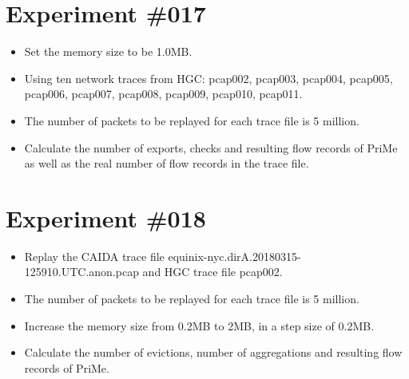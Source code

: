 \documentclass[10pt, conference, letterpaper]{IEEEtran}
\begin{document}
\section*{Experiment \#017}
\begin{itemize}
	\item Set the memory size to be 1.0MB.
	\item Using ten network traces from HGC: pcap002, pcap003, pcap004, pcap005, pcap006, pcap007, pcap008, pcap009, pcap010, pcap011.
	\item The number of packets to be replayed for each trace file is 5 million.
	\item Calculate the number of exports, checks and resulting flow records of PriMe as well as the real number of flow records in the trace file.
\end{itemize}

\section*{Experiment \#018}
\begin{itemize}
	\item Replay the CAIDA trace file equinix-nyc.dirA.20180315-125910.UTC.anon.pcap and HGC trace file pcap002.
	\item The number of packets to be replayed for each trace file is 5 million.
	\item Increase the memory size from 0.2MB to 2MB, in a step size of 0.2MB.
	\item Calculate the number of evictions, number of aggregations and resulting flow records of PriMe.
\end{itemize}
\end{document}
